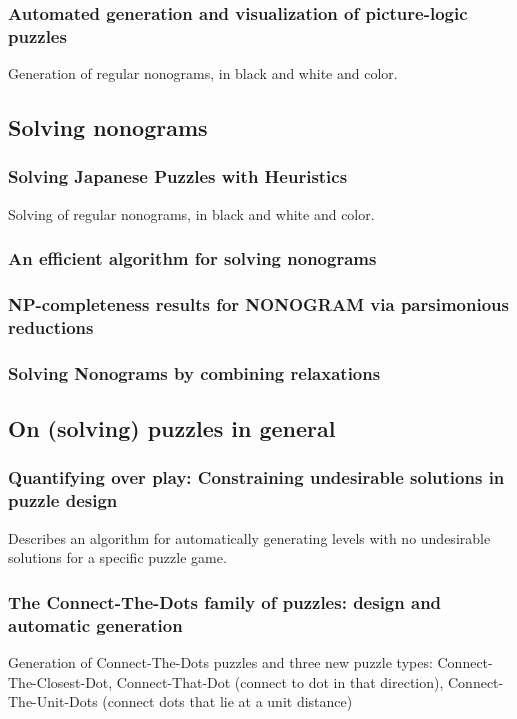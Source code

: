 \documentclass[a4paper]{article}
\begin{document}
\subsubsection{Automated generation and visualization of picture-logic puzzles \cite{ortiz2007automated}}
Generation of regular nonograms, in black and white and color. \\

\subsection{Solving nonograms}
\subsubsection{Solving Japanese Puzzles with Heuristics \cite{salcedo2007solving}}
Solving of regular nonograms, in black and white and color.\\

\subsubsection{An efficient algorithm for solving nonograms \cite{yu2011efficient}}

\subsubsection{NP-completeness results for NONOGRAM via parsimonious reductions\cite{ueda1996np}}

\subsubsection{Solving Nonograms by combining relaxations\cite{batenburg2009solving}}


\subsection{On (solving) puzzles in general}

\subsubsection{Quantifying over play: Constraining undesirable solutions in puzzle design \cite{smith2013quantifying}}
Describes an algorithm for automatically generating levels with no undesirable solutions for a specific puzzle game.

\subsubsection{The Connect-The-Dots family of puzzles: design and automatic generation \cite{loffler2014connect}}
Generation of Connect-The-Dots puzzles and three new puzzle types: Connect-The-Closest-Dot, Connect-That-Dot (connect to dot in that direction), Connect-The-Unit-Dots (connect dots that lie at a unit distance)
\end{document}
